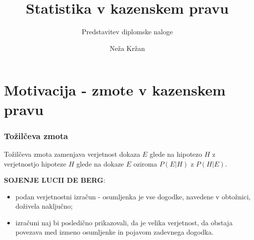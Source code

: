 \documentclass{beamer}
\begin{document}
\title{Statistika v kazenskem pravu}
\subtitle{Predstavitev diplomske naloge}
\author[Neža Kržan]{Neža Kržan}
 
\date[7. september 2023] {}

\subject{Talks}

\begin{frame}
   \titlepage
\end{frame}

\section{Motivacija - zmote v kazenskem pravu}

\begin{frame}
   \frametitle{Tožilčeva zmota}
   \begin{block}{Tožilčeva zmota}
      zamenjava verjetnost dokaza $E$ glede na hipotezo $H$ z verjetnostjo hipoteze $H$ glede na dokaze $E$ oziroma $P(E \lvert H)$ z $P(H \lvert E)$.
   \end{block} \vspace{4mm}
  \textbf{SOJENJE LUCII DE BERG}:
  \begin{itemize}
   \item podan verjetnostni izračun - osumljenka je vse dogodke, navedene v obtožnici, doživela naključno;
   \item izračuni naj bi posledično prikazovali, da je velika verjetnost, da obstaja povezava med izmeno osumljenke in pojavom zadevnega dogodka.
  \end{itemize}
\end{frame}
\end{document}
